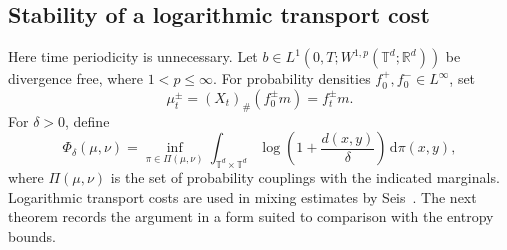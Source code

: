 \documentclass[review,12pt,times,a4paper,nopreprintline]{elsarticle}
\theoremstyle{plain}
\theoremstyle{definition}
\theoremstyle{remark}
\newcommand{\T}{\mathbb T}
\newcommand{\R}{\mathbb R}
\newcommand{\dd}{\,\mathrm d}
\numberwithin{equation}{section}
\begin{document}
\subsection{Stability of a logarithmic transport cost}
Here time periodicity is unnecessary. Let $b\in L^1(0,T;W^{1,p}(\T^d;\R^d))$ be divergence free, where $1<p\leq\infty$. For probability densities $f_0^+,f_0^-\in L^\infty$, set
\[
 \mu_t^\pm=(X_t)_\#(f_0^\pm m)=f_t^\pm m.
\]
For $\delta>0$, define
\begin{equation}\label{eq:logcost}
 \Phi_\delta(\mu,\nu)
 =\inf_{\pi\in\Pi(\mu,\nu)}
 \int_{\T^d\times\T^d}\log\left(1+\frac{d(x,y)}\delta\right)\dd\pi(x,y),
\end{equation}
where $\Pi(\mu,\nu)$ is the set of probability couplings with the indicated marginals. Logarithmic transport costs are used in mixing estimates by Seis~\cite{Seis}. The next theorem records the argument in a form suited to comparison with the entropy bounds.
\end{document}
